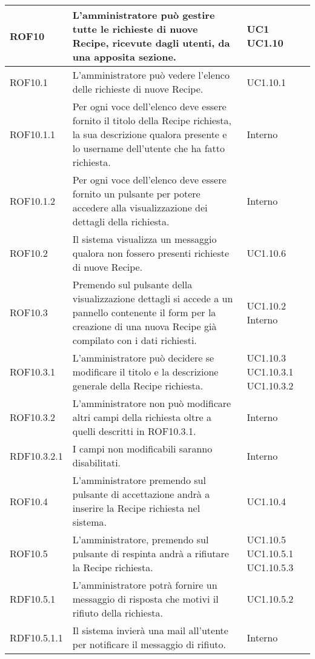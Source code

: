 \begin{center}
\begin{longtable}{| p{2.5cm} | p{8cm} | p{2cm} |}
		ROF10  &  L'amministratore può gestire tutte le richieste di nuove Recipe, ricevute dagli utenti, da una apposita sezione.  & UC1 \newline UC1.10 \\
		\hline
		ROF10.1  &  L'amministratore può vedere l'elenco delle richieste di nuove Recipe.  & UC1.10.1 \\
		\hline
		ROF10.1.1  &  Per ogni voce dell'elenco deve essere fornito il titolo della Recipe richiesta, la sua descrizione qualora presente e lo username dell'utente che ha fatto richiesta.  & Interno \\
		\hline
		ROF10.1.2  &  Per ogni voce dell'elenco deve essere fornito un pulsante per potere accedere alla visualizzazione dei dettagli della richiesta.  & Interno \\
		\hline
		ROF10.2  &  Il sistema visualizza un messaggio qualora non fossero presenti richieste di nuove Recipe.  & UC1.10.6 \\
		\hline
		ROF10.3  &  Premendo sul pulsante della visualizzazione dettagli si accede a un pannello contenente il form per la creazione di una nuova Recipe già compilato con i dati richiesti.  &  UC1.10.2 \newline Interno \\
		\hline
		ROF10.3.1  &  L'amministratore può decidere se modificare il titolo e la descrizione generale della Recipe richiesta.  & UC1.10.3 \newline UC1.10.3.1 \newline UC1.10.3.2 \\
		\hline
		ROF10.3.2  &  L'amministratore non può modificare altri campi della richiesta oltre a quelli descritti in ROF10.3.1.  & Interno \\
		\hline
		RDF10.3.2.1  &  I campi non modificabili saranno disabilitati.  & Interno \\
		\hline
		ROF10.4  &  L'amministratore premendo sul pulsante di accettazione andrà a inserire la Recipe richiesta nel sistema.  & UC1.10.4 \\
		\hline
		ROF10.5  &  L'amministratore, premendo sul pulsante di respinta andrà a rifiutare la Recipe richiesta.  & UC1.10.5 \newline UC1.10.5.1 \newline UC1.10.5.3 \\
		\hline
		RDF10.5.1  &  L'amministratore potrà fornire un messaggio di risposta che motivi il rifiuto della richiesta.  & UC1.10.5.2 \\
		\hline
		RDF10.5.1.1  &  Il sistema invierà una mail all'utente per notificare il messaggio di rifiuto.  &  Interno \\
		\hline


\end{longtable}
\end{center}
